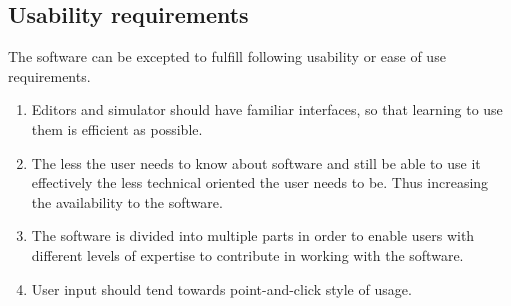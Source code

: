 \subsection{Usability requirements}
The software can be excepted to fulfill following usability or ease of use requirements.
\begin{enumerate}
	\item Editors and simulator should have familiar interfaces, so that learning to use them is efficient as possible.
	\item The less the user needs to know about software and still be able to use it effectively the less technical oriented the user needs to be. Thus increasing the availability to the software.
	\item The software is divided into multiple parts in order to enable users with different levels of expertise to contribute in working with the software.
	\item User input should tend towards point-and-click style of usage.
\end{enumerate}